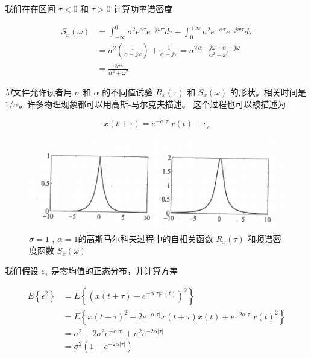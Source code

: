 	      我们在在区间 $\tau<0$ 和  $\tau>0$ 计算功率谱密度
	      
	       \begin{equation}\label{5.19}
	      \begin{aligned}
	      S_{x}(\omega)&=\int_{-\infty}^{0}\sigma^{2}e^{\alpha\tau}e^{-jw\tau}d\tau+\int_{0}^{+\infty}\sigma^{2}e^{-\alpha\tau}e^{-jw\tau}d\tau\\
	      &=\sigma^{2}(\frac{1}{\alpha-j\omega})+\frac{1}{\alpha-j\omega}=\sigma^{2}\frac{\alpha-j\omega+\alpha+j\omega}{\alpha^{2}+\omega^{2}}\\
	      &=\frac{2\sigma^{2}}{\alpha^{2}+\omega^{2}}
	      \end{aligned}
	      \end{equation}
	      
	      $ M $文件允许读者用 $ \sigma $ 和 $ \alpha $ 的不同值试验  $ R_{x}(\tau) $ 和  $ S_{x}(\omega) $ 的形状。相关时间是 $ 1/\alpha $。许多物理现象都可以用高斯-马尔克夫描述。
	      这个过程也可以被描述为
	      
	      \[ x(t+\tau)=e^{-\alpha|\tau|}x(t)+\epsilon_{\tau} \] 
	      
	      \begin{figure}[h]
	     	\centering
	     	\includegraphics[width=0.7\linewidth]{TeX_files/Part02/chapter05/image/1}
	     	\caption{ $ \sigma=1 $ , $\alpha=1$的高斯马尔科夫过程中的自相关函数 $ R_{x}(\tau) $ 和频谱密度函数 $ S_{x}(\omega) $  }
	     \end{figure}
	      
	      
	      
	      我们假设 $ \varepsilon_{\tau} $ 是零均值的正态分布，并计算方差
	      
	     	\begin{equation}\label{5.20}
	     \begin{aligned}
	     E\left\lbrace\epsilon_{\tau}^{2} \right\rbrace &=E\left\lbrace(x(t+\tau)-e^{-\alpha|\tau|x(t)})^{2} \right\rbrace\\
	     &=E\left\lbrace x(t+\tau)^{2}-2e^{-\alpha|\tau|}x(t+\tau)x(t)+e^{-2\alpha|\tau|}x(t)^{2}\right\rbrace \\
	     &=\sigma^{2}-2\sigma^{2}e^{-\alpha|\tau|} +\sigma^{2}e^{-2\alpha|\tau|}\\
	     &=\sigma^{2}(1-e^{-2\alpha|\tau|}) 
	     \end{aligned}
	     \end{equation}
	      
